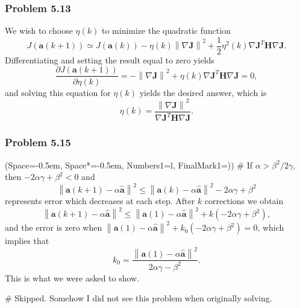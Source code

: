 \documentclass[12pt, a4paper]{article}
\newcommand{\listSpace}{-0.5em}%
\newcommand{\vect}[1]{\bm{#1}}
\newcommand{\norm}[1]{\left\lVert#1\right\rVert}
\begin{document}
\subsubsection*{Problem 5.13}
We wish to choose $\eta(k)$ to minimize the quadratic function
\begin{equation*}
	J \left( \vect{a}(k+1)  \right)
	\simeq
	J \left( \vect{a}(k)  \right)
	-
	\eta(k) \norm{\nabla \vect{J}}^2
	+
	\frac{1}{2} \eta^2(k) \nabla \vect{J}^T \vect{H} \nabla \vect{J}.
\end{equation*}
Differentiating and setting the result equal to zero yields
\begin{equation*}
	\frac{\partial J \left( \vect{a}(k+1)  \right)}{\partial \eta(k)}
	=
	-
	\norm{\nabla \vect{J}}^2
	+
	\eta(k) \nabla \vect{J}^T \vect{H} \nabla \vect{J} = 0,
\end{equation*}
and solving this equation for $\eta(k)$ yields the desired answer, which is
\begin{equation*}
	\eta(k) = \frac{\norm{\nabla \vect{J}}^2}{\nabla \vect{J}^T \vect{H} \nabla \vect{J}}.
\end{equation*}

\subsubsection*{Problem 5.15}
\begin{easylist}[enumerate]
	\ListProperties(Space=\listSpace, Space*=\listSpace, Numbers1=l, FinalMark1={)})
	#
If $\alpha > \beta^2 / 2 \gamma$, then $-2 \alpha \gamma +\beta^2 < 0$ and 
\begin{equation*}
	\norm{\vect{a}(k+1) - \alpha \hat{\vect{a}}}^2 
	\leq
	\norm{\vect{a}(k) - \alpha \hat{\vect{a}}}^2 - 2 \alpha \gamma +\beta^2
\end{equation*}
represents error which decreases at each step.
After $k$ corrections we obtain
\begin{equation*}
\norm{\vect{a}(k+1) - \alpha \hat{\vect{a}}}^2 
\leq
\norm{\vect{a}(1) - \alpha \hat{\vect{a}}}^2 + k(-2 \alpha \gamma +\beta^2),
\end{equation*}
and the error is zero when $\norm{\vect{a}(1) - \alpha \hat{\vect{a}}}^2 + k_0(-2 \alpha \gamma +\beta^2) = 0$, which implies that
\begin{equation*}
	k_0 = \frac{\norm{\vect{a}(1) - \alpha \hat{\vect{a}}}^2}{2 \alpha \gamma - \beta^2}.
\end{equation*}
This is what we were asked to show.

# Skipped. Somehow I did not see this problem when originally solving.
\end{easylist}
\end{document}
